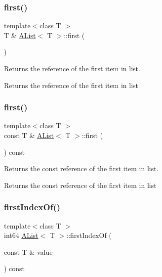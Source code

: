\subsubsection{\texorpdfstring{first()}{first()}\hspace{0.1cm}{\footnotesize\ttfamily [1/2]}}
{\footnotesize\ttfamily template$<$class T $>$ \\
T \& \mbox{\hyperlink{class_a_list}{A\+List}}$<$ T $>$\+::first (\begin{DoxyParamCaption}{ }\end{DoxyParamCaption})}



Returns the reference of the first item in list. 

\begin{DoxyReturn}{Returns}
the reference of the first item in list 
\end{DoxyReturn}
\mbox{\label{class_a_list_a1cf9c09ee90e96a5f72a39344f8240be}} 
\subsubsection{\texorpdfstring{first()}{first()}\hspace{0.1cm}{\footnotesize\ttfamily [2/2]}}
{\footnotesize\ttfamily template$<$class T $>$ \\
const T \& \mbox{\hyperlink{class_a_list}{A\+List}}$<$ T $>$\+::first (\begin{DoxyParamCaption}{ }\end{DoxyParamCaption}) const}



Returns the const reference of the first item in list. 

\begin{DoxyReturn}{Returns}
the const reference of the first item in list 
\end{DoxyReturn}
\mbox{\label{class_a_list_af785e824aa6822fa079fd146fdfbda8e}} 
\subsubsection{\texorpdfstring{firstIndexOf()}{firstIndexOf()}}
{\footnotesize\ttfamily template$<$class T $>$ \\
int64 \mbox{\hyperlink{class_a_list}{A\+List}}$<$ T $>$\+::first\+Index\+Of (\begin{DoxyParamCaption}\item[{const T \&}]{value }\end{DoxyParamCaption}) const}



